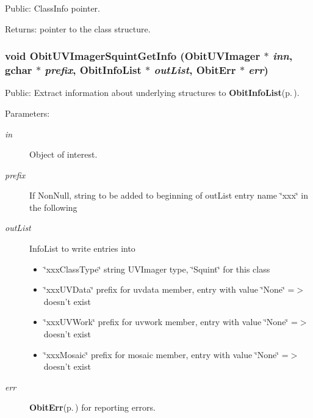 Public: Class\-Info pointer. 

\begin{Desc}
\item[Returns:]pointer to the class structure. \end{Desc}
\subsubsection{\setlength{\rightskip}{0pt plus 5cm}void Obit\-UVImager\-Squint\-Get\-Info ({\bf Obit\-UVImager} $\ast$ {\em inn}, gchar $\ast$ {\em prefix}, {\bf Obit\-Info\-List} $\ast$ {\em out\-List}, {\bf Obit\-Err} $\ast$ {\em err})}\label{ObitUVImagerSquint_8c_a16}


Public: Extract information about underlying structures to {\bf Obit\-Info\-List}{\rm (p.\,\pageref{structObitInfoList})}. 

\begin{Desc}
\item[Parameters:]
\begin{description}
\item[{\em in}]Object of interest. \item[{\em prefix}]If Non\-Null, string to be added to beginning of out\-List entry name \char`\"{}xxx\char`\"{} in the following \item[{\em out\-List}]Info\-List to write entries into \begin{itemize}
\item \char`\"{}xxx\-Class\-Type\char`\"{} string UVImager type, \char`\"{}Squint\char`\"{} for this class \item \char`\"{}xxx\-UVData\char`\"{} prefix for uvdata member, entry with value \char`\"{}None\char`\"{} =$>$ doesn't exist \item \char`\"{}xxx\-UVWork\char`\"{} prefix for uvwork member, entry with value \char`\"{}None\char`\"{} =$>$ doesn't exist \item \char`\"{}xxx\-Mosaic\char`\"{} prefix for mosaic member, entry with value \char`\"{}None\char`\"{} =$>$ doesn't exist \end{itemize}
\item[{\em err}]{\bf Obit\-Err}{\rm (p.\,\pageref{structObitErr})} for reporting errors. \end{description}
\end{Desc}

